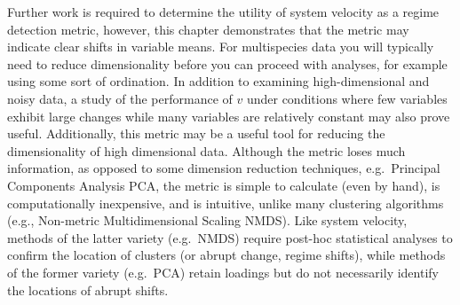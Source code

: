 \documentclass[12pt,twoside,openany]{reedthesis}
\begin{document}
Further work is required to determine the utility of system velocity as
a regime detection metric, however, this chapter demonstrates that the
metric may indicate clear shifts in variable means. For multispecies
data you will typically need to reduce dimensionality before you can
proceed with analyses, for example using some sort of ordination. In
addition to examining high-dimensional and noisy data, a study of the
performance of \(v\) under conditions where few variables exhibit large
changes while many variables are relatively constant may also prove
useful. Additionally, this metric may be a useful tool for reducing the
dimensionality of high dimensional data. Although the metric loses much
information, as opposed to some dimension reduction techniques,
e.g.~Principal Components Analysis PCA, the metric is simple to
calculate (even by hand), is computationally inexpensive, and is
intuitive, unlike many clustering algorithms (e.g., Non-metric
Multidimensional Scaling NMDS). Like system velocity, methods of the
latter variety (e.g.~NMDS) require post-hoc statistical analyses to
confirm the location of clusters (or abrupt change, regime shifts),
while methods of the former variety (e.g.~PCA) retain loadings but do
not necessarily identify the locations of abrupt shifts.
\end{document}

